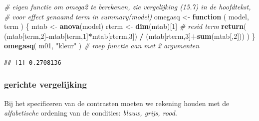 \documentclass[
]{book}
\newenvironment{Shaded}{\begin{snugshade}}{\end{snugshade}}
\newcommand{\CommentTok}[1]{\textcolor[rgb]{0.56,0.35,0.01}{\textit{#1}}}
\newcommand{\ControlFlowTok}[1]{\textcolor[rgb]{0.13,0.29,0.53}{\textbf{#1}}}
\newcommand{\DecValTok}[1]{\textcolor[rgb]{0.00,0.00,0.81}{#1}}
\newcommand{\FunctionTok}[1]{\textcolor[rgb]{0.13,0.29,0.53}{\textbf{#1}}}
\newcommand{\NormalTok}[1]{#1}
\newcommand{\OtherTok}[1]{\textcolor[rgb]{0.56,0.35,0.01}{#1}}
\newcommand{\SpecialCharTok}[1]{\textcolor[rgb]{0.81,0.36,0.00}{\textbf{#1}}}
\newcommand{\StringTok}[1]{\textcolor[rgb]{0.31,0.60,0.02}{#1}}
\begin{document}
\begin{Shaded}
\begin{Highlighting}[]
\CommentTok{\# eigen functie om omega2 te berekenen, zie vergelijking (15.7) in de hoofdtekst, }
\CommentTok{\# voor effect genaamd \textasciigrave{}term\textasciigrave{} in summary(\textasciigrave{}model\textasciigrave{})}
\NormalTok{omegasq }\OtherTok{\textless{}{-}} \ControlFlowTok{function}\NormalTok{ ( model, term ) \{   }
\NormalTok{     mtab }\OtherTok{\textless{}{-}} \FunctionTok{anova}\NormalTok{(model)}
\NormalTok{     rterm }\OtherTok{\textless{}{-}} \FunctionTok{dim}\NormalTok{(mtab)[}\DecValTok{1}\NormalTok{] }\CommentTok{\# resid term}
     \FunctionTok{return}\NormalTok{( (mtab[term,}\DecValTok{2}\NormalTok{]}\SpecialCharTok{{-}}\NormalTok{mtab[term,}\DecValTok{1}\NormalTok{]}\SpecialCharTok{*}\NormalTok{mtab[rterm,}\DecValTok{3}\NormalTok{]) }\SpecialCharTok{/} 
\NormalTok{             (mtab[rterm,}\DecValTok{3}\NormalTok{]}\SpecialCharTok{+}\FunctionTok{sum}\NormalTok{(mtab[,}\DecValTok{2}\NormalTok{])) )}
\NormalTok{     \}}
\FunctionTok{omegasq}\NormalTok{( m01, }\StringTok{"kleur"}\NormalTok{ ) }\CommentTok{\# roep functie aan met 2 argumenten}
\end{Highlighting}
\end{Shaded}

\begin{verbatim}
## [1] 0.2708136
\end{verbatim}

\subsubsection{gerichte vergelijking}\label{gerichte-vergelijking-2}

Bij het specificeren van de contrasten moeten we rekening houden met de \emph{alfabetische} ordening van de condities: \emph{blauw, grijs, rood}.
\end{document}
